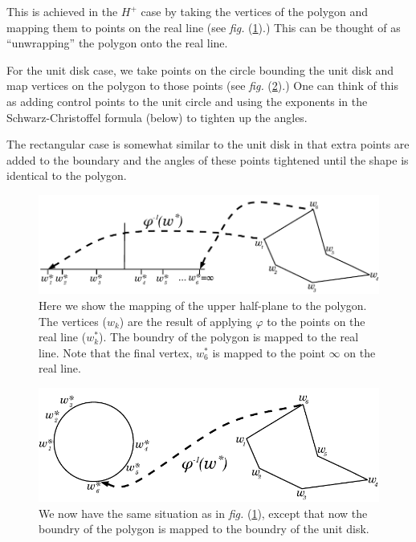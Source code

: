 \documentclass[a4paper,10pt]{amsart}
\newcommand{\sch}{Schwarz-Christoffel }
\newcommand{\fig}[1]{\emph{fig.} (\ref{#1})}
\renewcommand{\phi}{\varphi}
\begin{document}
This is achieved in the $H^+$ case by taking the vertices of the polygon and mapping them to points on the real line (see \fig{reallinedia}.) This can be thought of as ``unwrapping'' the polygon onto the real line. 

For the unit disk case, we take points on the circle bounding the unit disk and map vertices on the polygon to those points (see \fig{unitdiskdia}.) One can think of this as adding control points to the unit circle and using the exponents in the \sch formula (below) to tighten up the angles.

The rectangular case is somewhat similar to the unit disk in that extra points are added to the boundary and the angles of these points tightened until the shape is identical to the polygon.

\begin{figure} [tbp]
\centering
\includegraphics[scale=0.6]{figs/reallinedia.pdf}
\caption{Here we show the mapping of the upper half-plane to the polygon. The vertices ($w_k$) are the result of applying $\phi$ to the points on the real line ($w^*_k$). The boundry of the polygon is mapped to the real line. Note that the final vertex, $w^*_6$ is mapped to the point $\infty$ on the real line.}
\label{reallinedia}
\end{figure}

\begin{figure} [tbp]
\centering
\includegraphics[scale=0.6]{figs/unitdiskdia.pdf}
\caption{We now have the same situation as in \fig{reallinedia}, except that now the boundry of the polygon is mapped to the boundry of the unit disk.}
\label{unitdiskdia}
\end{figure}
\end{document}
